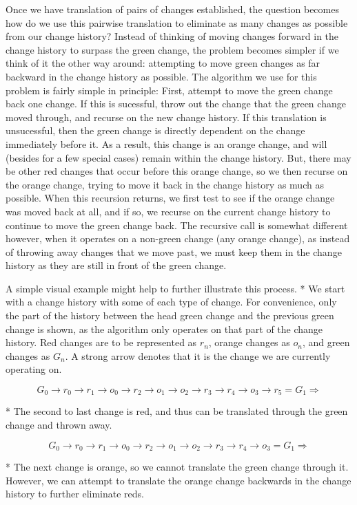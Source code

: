 \documentclass{article}
\newcommand{\insetarrow}[1]{=#1\Rightarrow}
\begin{document}
Once we have translation of pairs of changes established, 
the question becomes how do we use this pairwise translation 
to eliminate as many changes 
as possible from our change history? 
Instead of thinking of moving changes 
forward in the change history 
to surpass the green change, 
the problem becomes simpler 
if we think of it the other way around: 
attempting to move green changes 
as far backward 
in the change history as possible. 
The algorithm we use for this problem 
is fairly simple in principle: 
First, attempt to move the green change back one change. 
If this is sucessful, 
throw out the change that the green change moved through, 
and recurse on the new change history. 
If this translation is unsucessful, 
then the green change is directly dependent 
on the change immediately before it. 
As a result, 
this change is an orange change, 
and will (besides for a few special cases) 
remain within the change history. 
But, there may be other 
red changes that occur before this orange change, 
so we then recurse on the orange change, 
trying to move it back in the change history 
as much as possible. 
When this recursion returns, 
we first test to see if the orange change 
was moved back at all, 
and if so, 
we recurse on the current change history 
to continue to move the green change back. 
The recursive call is somewhat different however, 
when it operates on a non-green change (any orange change), 
as instead of throwing away changes 
that we move past, 
we must keep them in the change history 
as they are still in front of the green change.

A simple visual example 
might help to further illustrate this process.
* We start with a change history 
with some of each type of change. 
For convenience, 
only the part of the history 
between the head green change 
and the previous green change 
is shown, 
as the algorithm only operates 
on that part of the 
change history. 
Red changes are to be represented as $r_n$, 
orange changes as $o_n$, 
and green changes as $G_n$. 
A strong arrow denotes 
that it is the change we are currently operating on.

\[G_0\to r_0\to r_1\to o_0 
\to r_2\to o_1\to o_2\to r_3 
\to r_4\to o_3\to r_5 \insetarrow{G_1}\]

* The second to last change is red, 
and thus can be translated 
through the green change 
and thrown away.

\[G_0\to r_0\to r_1\to o_0 
\to r_2\to o_1\to o_2\to r_3 
\to r_4\to o_3\insetarrow{G_1}\]

* The next change is orange, 
so we cannot translate the green change 
through it. 
However, we can attempt 
to translate the orange change 
backwards in the change history 
to further eliminate reds.
\end{document}
